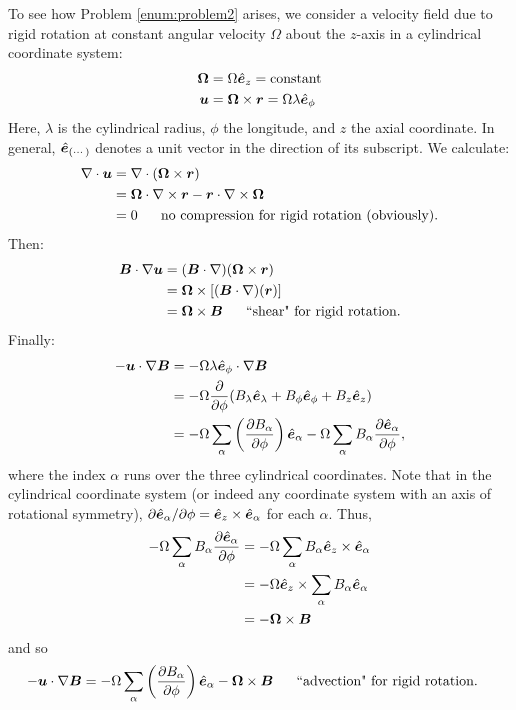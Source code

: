 \documentclass[12pt]{article}
\newcommand{\vecrot}{\bm{\Omega}}
\newcommand{\vecr}{\bm{r}}
\begin{document}
To see how Problem \ref{enum:problem2} arises, we consider a velocity field due to rigid rotation at constant angular velocity $\Omega$ about the $z$-axis in a cylindrical coordinate system:
\begin{subequations}
	\begin{align}
		\vecrot &= \Omega\ez=\text{constant}\\
		\vecu&=\vecrot\times\bm{r} = \Omega\lambda\ep
	\end{align}
\end{subequations}
Here, $\lambda$ is the cylindrical radius, $\phi$ the longitude, and $z$ the axial coordinate. In general,  $\hat{\bm{e}}_{(\cdots)}$ denotes a unit vector in the direction of its subscript. We calculate:
\begin{align}
	\Div\vecu&=\Div(\vecrot\times\bm{r})\nonumber\\
	&= \vecrot\dotgrad\times\vecr-\vecr\dotgrad\times\vecrot\nonumber\\
	&= 0\five\text{no compression for rigid rotation (obviously).}
\end{align}
Then:
\begin{align}
	\vecb\dotgrad\vecu&=(\vecb\dotgrad)(\vecrot\times\vecr)\nonumber\nonumber\\
	&= \vecrot\times[(\vecb\dotgrad)(\vecr)]\\
	&= \vecrot\times\vecb\five\text{``shear" for rigid rotation}.
\end{align}
Finally:
\begin{align*}
	-\bm{u}\cdot\nabla\bm{B} &= -\Omega\lambda\hat{\bm{e}}_\phi\cdot\nabla\bm{B}\\
	&=-\Omega\frac{\partial}{\partial\phi}(B_\lambda\hat{\bm{e}}_\lambda+B_\phi\hat{\bm{e}}_\phi+B_z\hat{\bm{e}}_z)\\
	&=-\Omega\sum_\alpha\left(\frac{\partial B_\alpha}{\partial\phi}\right)\hat{\bm{e}}_\alpha-\Omega\sum_\alpha B_\alpha\frac{\partial\hat{\bm{e}}_\alpha}{\partial\phi},
\end{align*}
where the index $\alpha$ runs over the three cylindrical coordinates. Note that in the cylindrical coordinate system (or indeed any coordinate system with an axis of rotational symmetry), $\partial\hat{\bm{e}}_\alpha/\partial\phi=\hat{\bm{e}}_z\times\hat{\bm{e}}_\alpha$ for each $\alpha$. Thus,
\begin{align*}
	-\Omega\sum_\alpha B_\alpha\pderiv{\e_\alpha}{\phi} &= -\Omega\sum_\alpha B_\alpha\ez\times\e_\alpha\\
	&=-\Omega\ez\times\sum_\alpha B_\alpha\e_\alpha\\
	&=-\vecrot\times\vecb
\end{align*}
and so
\begin{align}
	-\vecu\dotgrad\vecb &= -\Omega\sum_\alpha\left(\pderiv{B_\alpha}{\phi}\right)\e_\alpha-\vecrot\times\vecb \five \text{``advection" for rigid rotation}.
\end{align}
\end{document}
